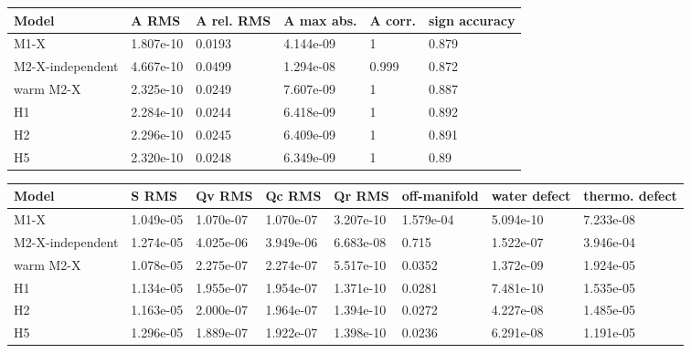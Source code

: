 \begin{tabular}{llllll}
\hline
Model & A RMS & A rel. RMS & A max abs. & A corr. & sign accuracy \\
\hline
M1-X & 1.807e-10 & 0.0193 & 4.144e-09 & 1 & 0.879 \\
M2-X-independent & 4.667e-10 & 0.0499 & 1.294e-08 & 0.999 & 0.872 \\
warm M2-X & 2.325e-10 & 0.0249 & 7.607e-09 & 1 & 0.887 \\
H1 & 2.284e-10 & 0.0244 & 6.418e-09 & 1 & 0.892 \\
H2 & 2.296e-10 & 0.0245 & 6.409e-09 & 1 & 0.891 \\
H5 & 2.320e-10 & 0.0248 & 6.349e-09 & 1 & 0.89 \\
\hline
\end{tabular}

\begin{tabular}{llllllll}
\hline
Model & S RMS & Qv RMS & Qc RMS & Qr RMS & off-manifold & water defect & thermo. defect \\
\hline
M1-X & 1.049e-05 & 1.070e-07 & 1.070e-07 & 3.207e-10 & 1.579e-04 & 5.094e-10 & 7.233e-08 \\
M2-X-independent & 1.274e-05 & 4.025e-06 & 3.949e-06 & 6.683e-08 & 0.715 & 1.522e-07 & 3.946e-04 \\
warm M2-X & 1.078e-05 & 2.275e-07 & 2.274e-07 & 5.517e-10 & 0.0352 & 1.372e-09 & 1.924e-05 \\
H1 & 1.134e-05 & 1.955e-07 & 1.954e-07 & 1.371e-10 & 0.0281 & 7.481e-10 & 1.535e-05 \\
H2 & 1.163e-05 & 2.000e-07 & 1.964e-07 & 1.394e-10 & 0.0272 & 4.227e-08 & 1.485e-05 \\
H5 & 1.296e-05 & 1.889e-07 & 1.922e-07 & 1.398e-10 & 0.0236 & 6.291e-08 & 1.191e-05 \\
\hline
\end{tabular}
